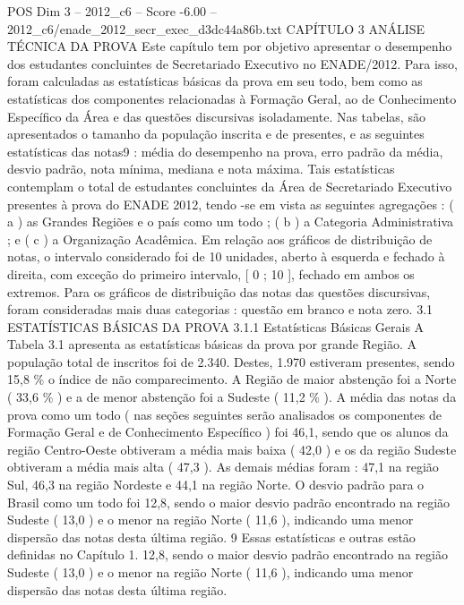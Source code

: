 \begin{textsample}{POS Dim 3 – 2012\_c6 – Score -6.00 – 2012\_c6/enade\_2012\_secr\_exec\_d3dc44a86b.txt}  \label{ex:f3_pos_258}
CAPÍTULO 3 ANÁLISE TÉCNICA DA PROVA Este capítulo tem por objetivo apresentar o desempenho dos estudantes concluintes de Secretariado Executivo no ENADE/2012.
Para isso, foram calculadas as estatísticas básicas da prova em seu todo, bem como as estatísticas dos componentes relacionadas à Formação Geral, ao de Conhecimento Específico da Área e das questões discursivas isoladamente.
Nas tabelas, são apresentados o tamanho da população inscrita e de presentes, e as seguintes estatísticas das notas9 : média do desempenho na prova, erro padrão da média, desvio padrão, nota mínima, mediana e nota máxima.
Tais estatísticas contemplam o total de estudantes concluintes da Área de Secretariado Executivo presentes à prova do ENADE 2012, tendo -se em vista as seguintes agregações : ( a ) as Grandes Regiões e o país como um todo ; ( b ) a Categoria Administrativa ; e ( c ) a Organização Acadêmica.
Em relação aos gráficos de distribuição de notas, o intervalo considerado foi de 10 unidades, aberto à esquerda e fechado à direita, com exceção do primeiro intervalo, [ 0 ; 10 ], fechado em ambos os extremos.
Para os gráficos de distribuição das notas das questões discursivas, foram consideradas mais duas categorias : questão em branco e nota zero. 3.1 ESTATÍSTICAS BÁSICAS DA PROVA 3.1.1 Estatísticas Básicas Gerais A Tabela 3.1 apresenta as estatísticas básicas da prova por grande Região.
A população total de inscritos foi de 2.340.
Destes, 1.970 estiveram presentes, sendo 15,8 \% o índice de não comparecimento.
A Região de maior abstenção foi a Norte ( 33,6 \% ) e a de menor abstenção foi a Sudeste ( 11,2 \% ).
A média das notas da prova como um todo ( nas seções seguintes serão analisados os componentes de Formação Geral e de Conhecimento Específico ) foi 46,1, sendo que os alunos da região Centro-Oeste obtiveram a média mais baixa ( 42,0 ) e os da região Sudeste obtiveram a média mais alta ( 47,3 ).
As demais médias foram : 47,1 na região Sul, 46,3 na região Nordeste e 44,1 na região Norte.
O desvio padrão para o Brasil como um todo foi 12,8, sendo o maior desvio padrão encontrado na região Sudeste ( 13,0 ) e o menor na região Norte ( 11,6 ), indicando uma menor dispersão das notas desta última região. 9 Essas estatísticas e outras estão definidas no Capítulo 1. 12,8, sendo o maior desvio padrão encontrado na região Sudeste ( 13,0 ) e o menor na região Norte ( 11,6 ), indicando uma menor dispersão das notas desta última região.

\end{textsample}
